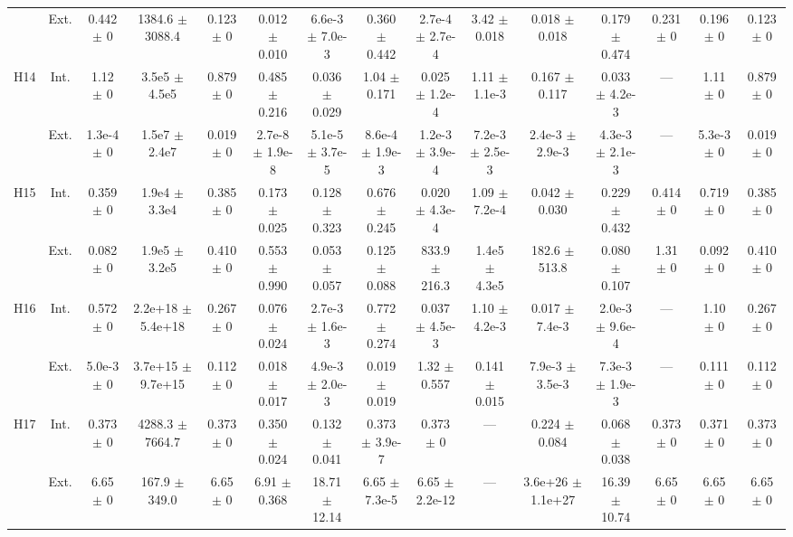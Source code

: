 \begin{table}[htbp]
{\begin{tabular}{@{}ccccccccccccccc@{}}
 & Ext. & 0.442 $\pm$ 0 & 1384.6 $\pm$ 3088.4 & 0.123 $\pm$ 0 & 0.012 $\pm$ 0.010 & 6.6e-3 $\pm$ 7.0e-3 & 0.360 $\pm$ 0.442 & 2.7e-4 $\pm$ 2.7e-4 & 3.42 $\pm$ 0.018 & 0.018 $\pm$ 0.018 & 0.179 $\pm$ 0.474 & 0.231 $\pm$ 0 & 0.196 $\pm$ 0 & 0.123 $\pm$ 0 \\
\cline{2-15}
\multirow{2}{*}{H14} & Int. & 1.12 $\pm$ 0 & 3.5e5 $\pm$ 4.5e5 & 0.879 $\pm$ 0 & 0.485 $\pm$ 0.216 & 0.036 $\pm$ 0.029 & 1.04 $\pm$ 0.171 & 0.025 $\pm$ 1.2e-4 & 1.11 $\pm$ 1.1e-3 & 0.167 $\pm$ 0.117 & 0.033 $\pm$ 4.2e-3 & --- & 1.11 $\pm$ 0 & 0.879 $\pm$ 0 \\
 & Ext. & 1.3e-4 $\pm$ 0 & 1.5e7 $\pm$ 2.4e7 & 0.019 $\pm$ 0 & 2.7e-8 $\pm$ 1.9e-8 & 5.1e-5 $\pm$ 3.7e-5 & 8.6e-4 $\pm$ 1.9e-3 & 1.2e-3 $\pm$ 3.9e-4 & 7.2e-3 $\pm$ 2.5e-3 & 2.4e-3 $\pm$ 2.9e-3 & 4.3e-3 $\pm$ 2.1e-3 & --- & 5.3e-3 $\pm$ 0 & 0.019 $\pm$ 0 \\
\cline{2-15}
\multirow{2}{*}{H15} & Int. & 0.359 $\pm$ 0 & 1.9e4 $\pm$ 3.3e4 & 0.385 $\pm$ 0 & 0.173 $\pm$ 0.025 & 0.128 $\pm$ 0.323 & 0.676 $\pm$ 0.245 & 0.020 $\pm$ 4.3e-4 & 1.09 $\pm$ 7.2e-4 & 0.042 $\pm$ 0.030 & 0.229 $\pm$ 0.432 & 0.414 $\pm$ 0 & 0.719 $\pm$ 0 & 0.385 $\pm$ 0 \\
 & Ext. & 0.082 $\pm$ 0 & 1.9e5 $\pm$ 3.2e5 & 0.410 $\pm$ 0 & 0.553 $\pm$ 0.990 & 0.053 $\pm$ 0.057 & 0.125 $\pm$ 0.088 & 833.9 $\pm$ 216.3 & 1.4e5 $\pm$ 4.3e5 & 182.6 $\pm$ 513.8 & 0.080 $\pm$ 0.107 & 1.31 $\pm$ 0 & 0.092 $\pm$ 0 & 0.410 $\pm$ 0 \\
\cline{2-15}
\multirow{2}{*}{H16} & Int. & 0.572 $\pm$ 0 & 2.2e+18 $\pm$ 5.4e+18 & 0.267 $\pm$ 0 & 0.076 $\pm$ 0.024 & 2.7e-3 $\pm$ 1.6e-3 & 0.772 $\pm$ 0.274 & 0.037 $\pm$ 4.5e-3 & 1.10 $\pm$ 4.2e-3 & 0.017 $\pm$ 7.4e-3 & 2.0e-3 $\pm$ 9.6e-4 & --- & 1.10 $\pm$ 0 & 0.267 $\pm$ 0 \\
 & Ext. & 5.0e-3 $\pm$ 0 & 3.7e+15 $\pm$ 9.7e+15 & 0.112 $\pm$ 0 & 0.018 $\pm$ 0.017 & 4.9e-3 $\pm$ 2.0e-3 & 0.019 $\pm$ 0.019 & 1.32 $\pm$ 0.557 & 0.141 $\pm$ 0.015 & 7.9e-3 $\pm$ 3.5e-3 & 7.3e-3 $\pm$ 1.9e-3 & --- & 0.111 $\pm$ 0 & 0.112 $\pm$ 0 \\
\cline{2-15}
\multirow{2}{*}{H17} & Int. & 0.373 $\pm$ 0 & 4288.3 $\pm$ 7664.7 & 0.373 $\pm$ 0 & 0.350 $\pm$ 0.024 & 0.132 $\pm$ 0.041 & 0.373 $\pm$ 3.9e-7 & 0.373 $\pm$ 0 & --- & 0.224 $\pm$ 0.084 & 0.068 $\pm$ 0.038 & 0.373 $\pm$ 0 & 0.371 $\pm$ 0 & 0.373 $\pm$ 0 \\
 & Ext. & 6.65 $\pm$ 0 & 167.9 $\pm$ 349.0 & 6.65 $\pm$ 0 & 6.91 $\pm$ 0.368 & 18.71 $\pm$ 12.14 & 6.65 $\pm$ 7.3e-5 & 6.65 $\pm$ 2.2e-12 & --- & 3.6e+26 $\pm$ 1.1e+27 & 16.39 $\pm$ 10.74 & 6.65 $\pm$ 0 & 6.65 $\pm$ 0 & 6.65 $\pm$ 0 \\

\end{tabular}}
\end{table}

